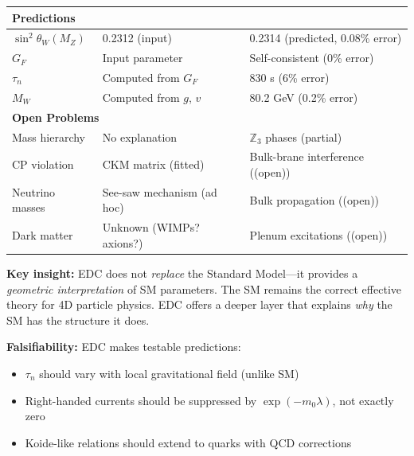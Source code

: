 \documentclass[11pt,a4paper]{book}
\theoremstyle{definition}
\theoremstyle{remark}
\begin{document}
\begin{center}
\begin{longtable}{p{4cm}p{5cm}p{5cm}}
\multicolumn{3}{l}{\textbf{Predictions}} \\
\midrule
$\sin^2\theta_W(M_Z)$ & 0.2312 (input) & 0.2314 (predicted, 0.08\% error) \\
$G_F$ & Input parameter & Self-consistent (0\% error) \\
$\tau_n$ & Computed from $G_F$ & 830 s (6\% error) \\
$M_W$ & Computed from $g$, $v$ & 80.2 GeV (0.2\% error) \\
\midrule

\multicolumn{3}{l}{\textbf{Open Problems}} \\
\midrule
Mass hierarchy & No explanation & $\mathbb{Z}_3$ phases (partial) \\
CP violation & CKM matrix (fitted) & Bulk-brane interference ((open)) \\
Neutrino masses & See-saw mechanism (ad hoc) & Bulk propagation ((open)) \\
Dark matter & Unknown (WIMPs? axions?) & Plenum excitations ((open)) \\

\end{longtable}
\end{center}

\textbf{Key insight:} EDC does not \emph{replace} the Standard Model---it provides
a \emph{geometric interpretation} of SM parameters. The SM remains the correct
effective theory for 4D particle physics. EDC offers a deeper layer that explains
\emph{why} the SM has the structure it does.

\textbf{Falsifiability:} EDC makes testable predictions:
\begin{itemize}
  \item $\tau_n$ should vary with local gravitational field (unlike SM)
  \item Right-handed currents should be suppressed by $\exp(-m_0\lambda)$, not exactly zero
  \item Koide-like relations should extend to quarks with QCD corrections
\end{itemize}




\end{document}
